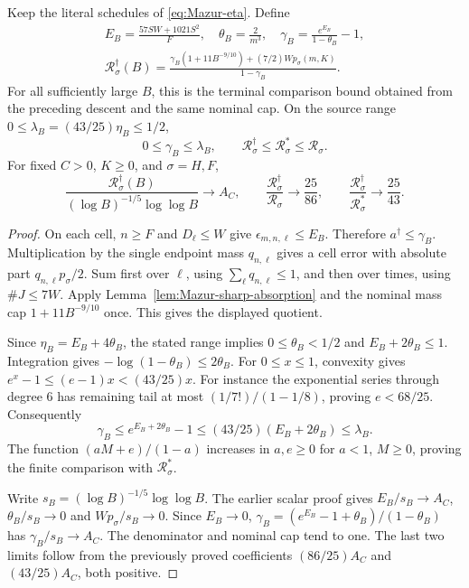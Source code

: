 \begin{corollary}
\label{cor:Mazur-exponential-terminal}
Keep the literal schedules of \eqref{eq:Mazur-eta}. Define
\begin{equation}
 \begin{gathered}
 E_B=\frac{57SW+1021S^2}{F},\quad
 \theta_B=\frac2{m^3},\quad
 \gamma_B=\frac{e^{E_B}}{1-\theta_B}-1,\\
 \mathcal R_\sigma^\dagger(B)=
 \frac{\gamma_B(1+11B^{-9/10})+(7/2)W p_\sigma(m,K)}
       {1-\gamma_B}.
 \end{gathered}
 \label{eq:Mazur-exponential-terminal}
\end{equation}
For all sufficiently large $B$, this is the terminal comparison bound
obtained from the preceding descent and the same nominal cap.
On the source range $0\le\lambda_B=(43/25)\eta_B\le1/2$,
\[
 0\le\gamma_B\le\lambda_B,\qquad
 \mathcal R_\sigma^\dagger\le\mathcal R_\sigma^*\le\mathcal R_\sigma.
\]
For fixed $C>0$, $K\ge0$, and $\sigma=H,F$,
\[
 \frac{\mathcal R_\sigma^\dagger(B)}
      {(\log B)^{-1/5}\log\log B}\longrightarrow A_C,\qquad
 \frac{\mathcal R_\sigma^\dagger}{\mathcal R_\sigma}
       \longrightarrow\frac{25}{86},\qquad
 \frac{\mathcal R_\sigma^\dagger}{\mathcal R_\sigma^*}
       \longrightarrow\frac{25}{43}.
\]
\end{corollary}
\begin{proof}
On each cell, $n\ge F$ and $D_\ell\le W$ give
$\epsilon_{m,n,\ell}\le E_B$. Therefore $a^\dagger\le\gamma_B$.
Multiplication by the single endpoint mass $q_{n,\ell}$
gives a cell error with absolute part $q_{n,\ell}p_\sigma/2$.
Sum first over $\ell$, using $\sum_\ell q_{n,\ell}\le1$, and
then over times, using $\#J\le7W$.
Apply Lemma~\ref{lem:Mazur-sharp-absorption} and the nominal mass
cap $1+11B^{-9/10}$ once. This gives the displayed quotient.

Since $\eta_B=E_B+4\theta_B$, the stated range implies
$0\le\theta_B<1/2$ and $E_B+2\theta_B\le1$.
Integration gives $-\log(1-\theta_B)\le2\theta_B$.
For $0\le x\le1$, convexity gives
$e^x-1\le(e-1)x<(43/25)x$. For instance the exponential series
through degree $6$ has remaining tail at most
$(1/7!)/(1-1/8)$, proving $e<68/25$.
Consequently
\[
 \gamma_B
 \le e^{E_B+2\theta_B}-1
 \le(43/25)(E_B+2\theta_B)\le\lambda_B.
\]
The function $(aM+e)/(1-a)$ increases in $a,e\ge0$ for $a<1$,
$M\ge0$, proving the finite comparison with $\mathcal R_\sigma^*$.

Write $s_B=(\log B)^{-1/5}\log\log B$. The earlier scalar proof gives
$E_B/s_B\to A_C$, $\theta_B/s_B\to0$ and $Wp_\sigma/s_B\to0$.
Since $E_B\to0$,
$\gamma_B=(e^{E_B}-1+\theta_B)/(1-\theta_B)$ has
$\gamma_B/s_B\to A_C$. The denominator and nominal cap tend to one.
The last two limits follow from the previously proved coefficients
$(86/25)A_C$ and $(43/25)A_C$, both positive.
\end{proof}

